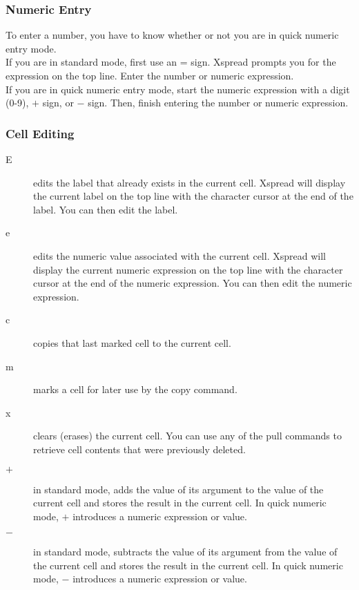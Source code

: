 \subsubsection*{Numeric Entry}

    To enter a number, you have to know whether or not you are in quick 
numeric entry mode.\\
    If you are in standard mode, first use an = sign.  Xspread prompts you for 
the expression on the top line.  Enter the number or numeric expression.\\
    If you are in quick numeric entry mode, start the numeric expression with 
a digit (0-9), $+$ sign, or $-$ sign.  Then, finish entering the number or
numeric expression.

\subsubsection*{Cell Editing}

\begin{description}
\item[E]{ edits the label that already exists in the current cell.  Xspread will 
display the current label on the top line with the character cursor at the end 
of the label.  You can then edit the label.}

\item[e]{ edits the numeric value associated with the current cell.  Xspread will 
display the current numeric expression on the top line with the character 
cursor at the end of the numeric expression.  You can then edit the numeric 
expression.}

\item[c]{ copies that last marked cell to the current cell.}

\item[m]{ marks a cell for later use by the copy command.}

\item[x]{ clears (erases) the current cell.  You can use any of the pull commands 
to retrieve cell contents that were previously deleted.}

\item[$+$]{ in standard mode, adds the value of its argument to the value
of the current cell and stores the result in the current cell.  In quick
numeric mode, $+$ introduces a numeric expression or value.}

\item[$-$]{ in standard mode, subtracts the value of its argument from the
value of the current cell and stores the result in the current cell.  In quick
numeric mode, $-$ introduces a numeric expression or value.}
\end{description}

